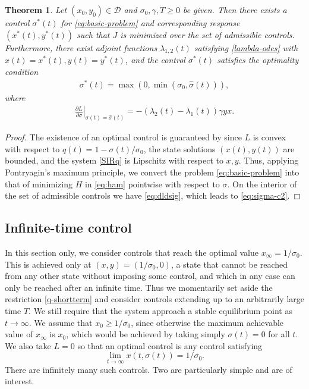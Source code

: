 \documentclass[english,12pt,letter]{article}
\newtheorem{thm}{Theorem}
\newcommand{\Rnot}{\sigma_0}
\newcommand{\Sinf}{x_\infty}
\newcommand{\dom}{{\mathcal D}}
\begin{document}
\begin{thm}
    Let $(x_0, y_0)\in\dom$ and $\Rnot, \gamma, T\ge 0$ be given.  Then there
    exists a control $\sigma^*(t)$ for \eqref{eq:basic-problem} and corresponding
    response $(x^*(t),y^*(t))$ such that $J$ is minimized over the set of
    admissible controls.  Furthermore, there exist adjoint functions
    $\lambda_{1,2}(t)$ satisfying \eqref{lambda-odes} with $x(t)=x^*(t), y(t)=y^*(t)$, and
    the control $\sigma^*(t)$ satisfies the optimality condition
    \begin{align} \label{eq:sigma-c2}
        \sigma^*(t) = \max\left(0,\min\left(\sigma_0,\hat{\sigma}(t)\right)\right),
    \end{align}
    where
    \begin{align} \label{eq:dldsig}
        \left. \frac{\partial L}{\partial \sigma}\right|_{\sigma(t)=\hat{\sigma}(t)} = - (\lambda_2(t)-\lambda_1(t))\gamma y x.
    \end{align}
\end{thm}
\begin{proof}
    The existence of an optimal control is guaranteed by \cite[Corollary 4.1]{fleming2012deterministic} since
    $L$ is convex with respect to $q(t)=1-\sigma(t)/\Rnot$, the state solutions $(x(t),y(t))$
    are bounded, and the system \eqref{SIRq} is Lipschitz with respect to $x, y$.
    Thus, applying Pontryagin's maximum principle, we convert the problem \eqref{eq:basic-problem}
    into that of minimizing $H$ in \eqref{eq:ham} pointwise with respect to $\sigma$.  On
    the interior of the set of admissible controls we have \eqref{eq:dldsig}, which leads to
    \eqref{eq:sigma-c2}.
\end{proof}


\subsection{Infinite-time control}
In this section only, we consider controls that reach the optimal value $\Sinf = 1/\Rnot$.
This is achieved only at $(x,y)=(1/\Rnot,0)$, a state that cannot be reached
from any other state without imposing some control, and which in any case can
only be reached after an infinite time.  Thus we momentarily set aside the restriction
\eqref{q-shortterm} and consider controls extending up to an arbitrarily large time $T$.
We still require that the system approach a stable equilibrium point as $t\to\infty$.
We assume that $x_0\ge1/\Rnot$, since otherwise the maximum achievable value of $\Sinf$
is $x_0$, which would be achieved by taking simply $\sigma(t)=0$ for all $t$.
We also take $L=0$ so that an optimal control is any control satisfying
$$
    \lim_{t \to \infty} x(t,\sigma(t)) = 1/\Rnot.
$$
There are infinitely many such controls.  Two are particularly simple and
are of interest.
\end{document}
